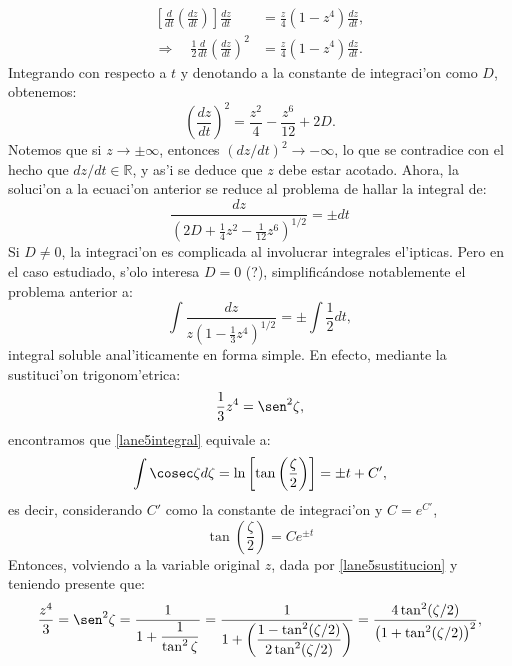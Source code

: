 \begin{align}
\left[\frac{d}{dt}\left(\frac{dz}{dt}\right)\right]\frac{dz}{dt}&=\frac{z}{4}(1-z^4)\frac{dz}{dt},\\
\Rightarrow\quad \frac{1}{2}\frac{d}{dt}\left(\frac{dz}{dt}\right)^2&=\frac{z}{4}(1-z^4)\frac{dz}{dt}.
\end{align}
Integrando con respecto a $t$ y denotando a la constante de integraci'on como $D$, obtenemos:
\begin{equation}
\left(\frac{dz}{dt}\right)^2=\frac{z^2}{4}-\frac{z^6}{12}+2D.
\end{equation}
Notemos que si $z\to\pm\infty$, entonces $(dz/dt)^2\to-\infty$, lo que se contradice con el hecho que $dz/dt\in \mathbb{R}$, y as'i se deduce que $z$ debe estar acotado. Ahora, la soluci'on a la ecuaci'on anterior se reduce al problema de hallar la integral de:
\begin{equation}
 \frac{dz}{\left(2D+\frac{1}{4}z^2-\frac{1}{12}z^6\right)^{1/2}}=\pm dt
\end{equation}
Si $D\neq0$, la integraci'on es complicada al involucrar integrales el'ipticas. Pero en el caso estudiado, s'olo interesa $D=0$ (?), simplific\'andose notablemente el problema anterior a:
\begin{equation}\label{lane5integral}
 \int\frac{dz}{z\left(1-\frac{1}{3}z^4\right)^{1/2}}=\pm\int\frac{1}{2}dt,
\end{equation}
integral soluble anal'iticamente en forma simple. En efecto, mediante la sustituci'on trigonom'etrica:
\begin{equation}\label{lane5sustitucion}
\frac{1}{3}z^4=\sen^2 \zeta,
\end{equation}
encontramos que \eqref{lane5integral} equivale a:
\begin{equation}
\int\cosec\zeta d\zeta =\ln\left[\tan\left(\frac{\zeta}{2}\right)\right]=\pm t+C',
\end{equation}
es decir, considerando $C'$ como la constante de integraci'on y $C=e^{C'}$,
\begin{equation}
 \tan\left(\frac{\zeta}{2}\right)=C e^{\pm t}
\end{equation}
Entonces, volviendo a la variable original $z$, dada por \eqref{lane5sustitucion} y teniendo presente que:
\begin{equation}
\frac{z^4}{3}= \sen^2 \zeta=\frac{1}{1+\dfrac{1}
{\tan^2\zeta}}=\frac{1}{1+\left(\dfrac{1-\tan^2(\zeta/2)}
{2\tan^2(\zeta/2)}\right)}=\frac{4\tan^2(\zeta/2)}{\left(1+\tan^2(\zeta/2)\right)^2},
\end{equation}
